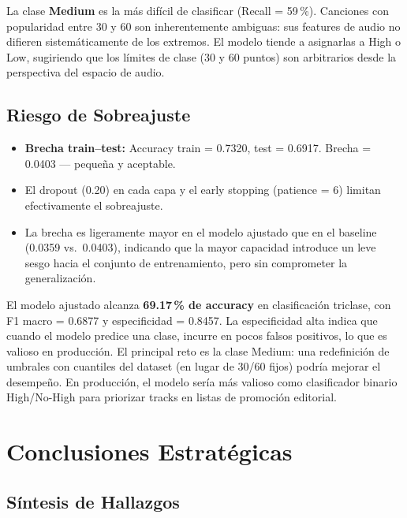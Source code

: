 \documentclass[12pt,a4paper]{article}
\begin{document}
La clase \textbf{Medium} es la m\'as dif\'icil de clasificar (Recall = 59\,\%).
Canciones con popularidad entre 30 y 60 son inherentemente ambiguas: sus features de
audio no difieren sistem\'aticamente de los extremos. El modelo tiende a asignarlas a
High o Low, sugiriendo que los l\'imites de clase (30 y 60 puntos) son arbitrarios desde
la perspectiva del espacio de audio.

\subsection{Riesgo de Sobreajuste}

\begin{itemize}[noitemsep]
  \item \textbf{Brecha train--test:} Accuracy train = 0.7320, test = 0.6917.
    Brecha = 0.0403 --- peque\~na y aceptable.
  \item El dropout (0.20) en cada capa y el early stopping (patience = 6) limitan
    efectivamente el sobreajuste.
  \item La brecha es ligeramente mayor en el modelo ajustado que en el baseline
    (0.0359 vs.\ 0.0403), indicando que la mayor capacidad introduce un leve sesgo hacia
    el conjunto de entrenamiento, pero sin comprometer la generalizaci\'on.
\end{itemize}

\begin{ejecutivo}
El modelo ajustado alcanza \textbf{69.17\,\% de accuracy} en clasificaci\'on triclase,
con F1 macro = 0.6877 y especificidad = 0.8457. La especificidad alta indica que cuando
el modelo predice una clase, incurre en pocos falsos positivos, lo que es valioso en
producci\'on. El principal reto es la clase Medium: una redefinici\'on de umbrales con
cuantiles del dataset (en lugar de 30/60 fijos) podr\'ia mejorar el desempe\~no.
En producci\'on, el modelo ser\'ia m\'as valioso como clasificador binario High/No-High
para priorizar tracks en listas de promoci\'on editorial.
\end{ejecutivo}

\section{Conclusiones Estrat\'egicas}

\subsection{S\'intesis de Hallazgos}
\end{document}
